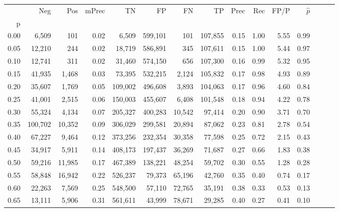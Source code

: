 \begin{tabular}{rrrrrrrrrrrrrrr}
\toprule
{} &      Neg &     Pos & mPrec &       TN &       FP &       FN &       TP &  Prec &   Rec &  FP/P & $\hat{p}$ \\
p    &          &         &       &          &          &          &          &       &       &       &           \\
\midrule
0.00 &    6,509 &     101 &  0.02 &    6,509 &  599,101 &      101 &  107,855 &  0.15 &  1.00 &  5.55 &      0.99 \\
0.05 &   12,210 &     244 &  0.02 &   18,719 &  586,891 &      345 &  107,611 &  0.15 &  1.00 &  5.44 &      0.97 \\
0.10 &   12,741 &     311 &  0.02 &   31,460 &  574,150 &      656 &  107,300 &  0.16 &  0.99 &  5.32 &      0.95 \\
0.15 &   41,935 &   1,468 &  0.03 &   73,395 &  532,215 &    2,124 &  105,832 &  0.17 &  0.98 &  4.93 &      0.89 \\
0.20 &   35,607 &   1,769 &  0.05 &  109,002 &  496,608 &    3,893 &  104,063 &  0.17 &  0.96 &  4.60 &      0.84 \\
0.25 &   41,001 &   2,515 &  0.06 &  150,003 &  455,607 &    6,408 &  101,548 &  0.18 &  0.94 &  4.22 &      0.78 \\
0.30 &   55,324 &   4,134 &  0.07 &  205,327 &  400,283 &   10,542 &   97,414 &  0.20 &  0.90 &  3.71 &      0.70 \\
0.35 &  100,702 &  10,352 &  0.09 &  306,029 &  299,581 &   20,894 &   87,062 &  0.23 &  0.81 &  2.78 &      0.54 \\
0.40 &   67,227 &   9,464 &  0.12 &  373,256 &  232,354 &   30,358 &   77,598 &  0.25 &  0.72 &  2.15 &      0.43 \\
0.45 &   34,917 &   5,911 &  0.14 &  408,173 &  197,437 &   36,269 &   71,687 &  0.27 &  0.66 &  1.83 &      0.38 \\
0.50 &   59,216 &  11,985 &  0.17 &  467,389 &  138,221 &   48,254 &   59,702 &  0.30 &  0.55 &  1.28 &      0.28 \\
0.55 &   58,848 &  16,942 &  0.22 &  526,237 &   79,373 &   65,196 &   42,760 &  0.35 &  0.40 &  0.74 &      0.17 \\
0.60 &   22,263 &   7,569 &  0.25 &  548,500 &   57,110 &   72,765 &   35,191 &  0.38 &  0.33 &  0.53 &      0.13 \\
0.65 &   13,111 &   5,906 &  0.31 &  561,611 &   43,999 &   78,671 &   29,285 &  0.40 &  0.27 &  0.41 &      0.10 \\

\end{tabular}
